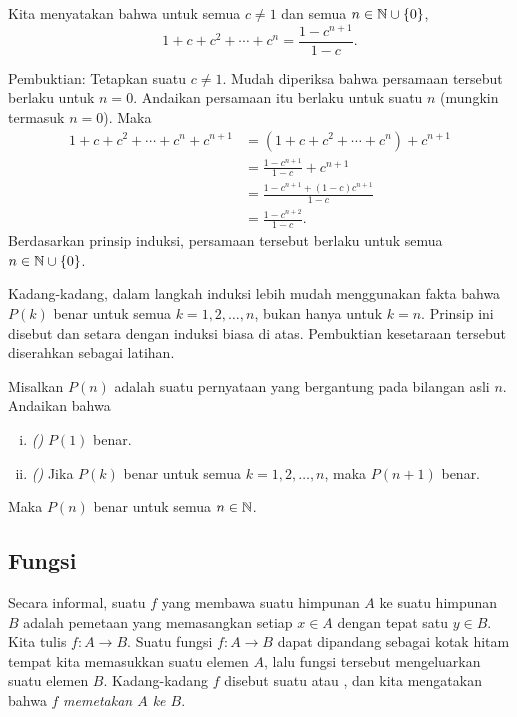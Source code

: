 \begin{example} \label{example:geometricsum}
Kita menyatakan bahwa untuk semua $c \neq 1$
dan semua $n \in {\mathbb{N}} \cup \{ 0 \}$,
\begin{equation*}
1 + c + c^2 + \cdots + c^n = \frac{1-c^{n+1}}{1-c} .
\end{equation*}

Pembuktian: Tetapkan suatu $c \neq 1$.
Mudah diperiksa bahwa persamaan tersebut berlaku untuk $n=0$.
Andaikan persamaan itu berlaku untuk suatu $n$ (mungkin termasuk $n=0$).
Maka
\begin{equation*}
\begin{split}
1 + c + c^2 + \cdots + c^n + c^{n+1} & =
( 1 + c + c^2 + \cdots + c^n ) + c^{n+1} \\
& = \frac{1-c^{n+1}}{1-c}  + c^{n+1} \\
& = \frac{1-c^{n+1}  + (1-c)c^{n+1}}{1-c} \\
& = \frac{1-c^{n+2}}{1-c} .
\end{split}
\end{equation*}
Berdasarkan prinsip induksi, persamaan tersebut berlaku untuk semua
$n \in {\mathbb{N}} \cup \{ 0 \}$.
\end{example}

Kadang-kadang, dalam langkah induksi lebih mudah menggunakan fakta
bahwa $P(k)$ benar untuk semua $k = 1,2,\ldots,n$, bukan hanya untuk $k=n$.
Prinsip ini disebut \emph{} dan setara
dengan induksi biasa di atas.  Pembuktian kesetaraan tersebut
diserahkan sebagai latihan.

\begin{thm}
Misalkan $P(n)$ adalah suatu pernyataan yang bergantung pada bilangan asli
$n$.  Andaikan bahwa
\begin{enumerate}[(i)]
\item \emph{()} $P(1)$ benar.
\item \emph{()} Jika $P(k)$ benar untuk semua
$k = 1,2,\ldots,n$, maka $P(n+1)$ benar.
\end{enumerate}
Maka $P(n)$ benar untuk semua $n \in {\mathbb{N}}$.
\end{thm}

\subsection{Fungsi}

Secara informal,
suatu \emph{}
$f$ yang membawa suatu himpunan $A$ ke suatu himpunan $B$
adalah pemetaan yang memasangkan setiap $x \in A$ dengan tepat satu $y \in B$.  Kita tulis
$f \colon A \to B$.
Suatu fungsi $f
\colon A \to B$ dapat dipandang sebagai
kotak hitam tempat kita memasukkan suatu elemen $A$,
lalu fungsi tersebut
mengeluarkan suatu elemen $B$.
Kadang-kadang $f$ disebut suatu \emph{} atau
\emph{},
dan kita mengatakan bahwa $f$ \emph{memetakan $A$ ke $B$}.

